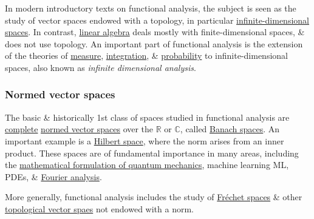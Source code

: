 \documentclass{article}
\begin{document}
In modern introductory texts on functional analysis, the subject is seen as the study of vector spaces endowed with a topology, in particular \href{https://en.wikipedia.org/wiki/Dimension_(vector_space)}{infinite-dimensional spaces}. In contrast, \href{https://en.wikipedia.org/wiki/Linear_algebra}{linear algebra} deals mostly with finite-dimensional spaces, \& does not use topology. An important part of functional analysis is the extension of the theories of \href{https://en.wikipedia.org/wiki/Measure_(mathematics)}{measure}, \href{https://en.wikipedia.org/wiki/Integral}{integration}, \& \href{https://en.wikipedia.org/wiki/Probability}{probability} to infinite-dimensional spaces, also known as {\it infinite dimensional analysis}.

\subsubsection{Normed vector spaces}
The basic \& historically 1st class of spaces studied in functional analysis are \href{https://en.wikipedia.org/wiki/Complete_space}{complete} \href{https://en.wikipedia.org/wiki/Normed_vector_space}{normed vector spaces} over the $\mathbb{R}$ or $\mathbb{C}$, called \href{https://en.wikipedia.org/wiki/Banach_space}{Banach spaces}. An important example is a \href{https://en.wikipedia.org/wiki/Hilbert_space}{Hilbert space}, where the norm arises from an inner product. These spaces are of fundamental importance in many areas, including the \href{https://en.wikipedia.org/wiki/Mathematical_formulation_of_quantum_mechanics}{mathematical formulation of quantum mechanics}, machine learning ML, PDEs, \& \href{https://en.wikipedia.org/wiki/Fourier_analysis}{Fourier analysis}.

More generally, functional analysis includes the study of \href{https://en.wikipedia.org/wiki/Fr%C3%A9chet_space}{Fr\'echet spaces} \& other \href{https://en.wikipedia.org/wiki/Topological_vector_space}{topological vector spaes} not endowed with a norm.
\end{document}
